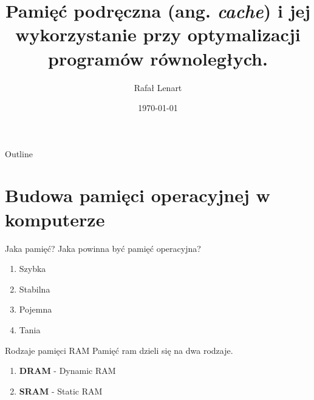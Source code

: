 \documentclass{beamer}
\title{Pamięć podręczna (ang. \emph{cache}) i jej wykorzystanie przy optymalizacji programów równoległych.}
\author{Rafał Lenart}
\date{\today}
\begin{document}
\begin{frame}
    \titlepage 
\end{frame}


\begin{frame}{Outline}
    \tableofcontents
\end{frame}


\section{Budowa pamięci operacyjnej w komputerze}
\begin{frame}{Jaka pamięć?}
	Jaka powinna być pamięć operacyjna?
	\begin{enumerate}
	\pause
	\item Szybka
	\pause
	\item Stabilna
	\pause
	\item Pojemna
	\pause
	\item Tania
	\end{enumerate}
\end{frame}


\begin{frame}{Rodzaje pamięci RAM}
Pamięć ram dzieli się na dwa rodzaje.
\begin{enumerate}
    \item \textbf{DRAM} - Dynamic RAM
    \item \textbf{SRAM} - Static RAM
\end{enumerate}

\end{frame}
\end{document}
